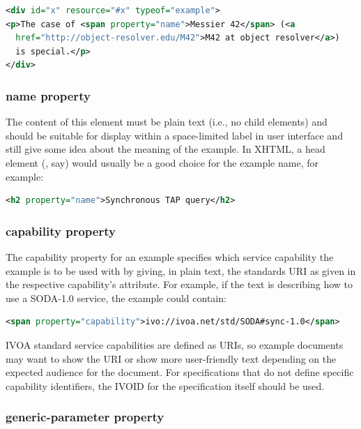 \documentclass[11pt,letter]{ivoa}
\begin{document}
\begin{lstlisting}[language=XML]
<div id="x" resource="#x" typeof="example">
<p>The case of <span property="name">Messier 42</span> (<a
  href="http://object-resolver.edu/M42">M42 at object resolver</a>)
  is special.</p>
</div>
\end{lstlisting}

\subsubsection{name property}

The content of this element must be plain text (i.e., no child
elements) and
should be suitable for display within a
space-limited label in user interface and still give some idea about the meaning
of the example.  In XHTML, a head element (, say) would usually be a good
choice for the example name, for example:

\begin{lstlisting}[language=XML]
<h2 property="name">Synchronous TAP query</h2>
\end{lstlisting}

\subsubsection{capability property}

The capability property for an example specifies which service capability the
example is to be used with by giving, in plain text, the standards URI
as given in the respective capability's  attribute.
For example, if the text is describing how to use a
SODA-1.0 service, the example could contain:

\begin{lstlisting}[language=XML]
<span property="capability">ivo://ivoa.net/std/SODA#sync-1.0</span>
\end{lstlisting}

IVOA standard service capabilities are defined as URIs,  so example documents
may want to show the URI or show more user-friendly text depending on the
expected audience for the document. For specifications that do not define
specific capability identifiers, the IVOID for the specification itself should
be used.

\subsubsection{generic-parameter property}
\end{document}
